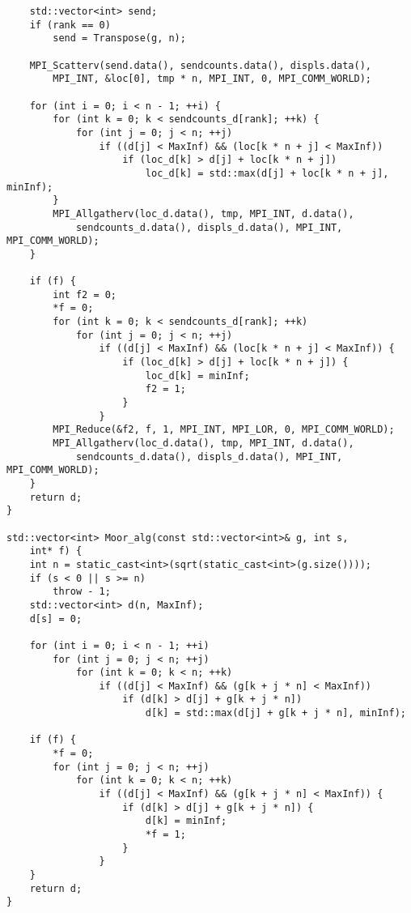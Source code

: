 \documentclass{report}
\begin{document}
\begin{lstlisting}
    std::vector<int> send;
    if (rank == 0)
        send = Transpose(g, n);

    MPI_Scatterv(send.data(), sendcounts.data(), displs.data(),
        MPI_INT, &loc[0], tmp * n, MPI_INT, 0, MPI_COMM_WORLD);

    for (int i = 0; i < n - 1; ++i) {
        for (int k = 0; k < sendcounts_d[rank]; ++k) {
            for (int j = 0; j < n; ++j)
                if ((d[j] < MaxInf) && (loc[k * n + j] < MaxInf))
                    if (loc_d[k] > d[j] + loc[k * n + j])
                        loc_d[k] = std::max(d[j] + loc[k * n + j], minInf);
        }
        MPI_Allgatherv(loc_d.data(), tmp, MPI_INT, d.data(),
            sendcounts_d.data(), displs_d.data(), MPI_INT, MPI_COMM_WORLD);
    }

    if (f) {
        int f2 = 0;
        *f = 0;
        for (int k = 0; k < sendcounts_d[rank]; ++k)
            for (int j = 0; j < n; ++j)
                if ((d[j] < MaxInf) && (loc[k * n + j] < MaxInf)) {
                    if (loc_d[k] > d[j] + loc[k * n + j]) {
                        loc_d[k] = minInf;
                        f2 = 1;
                    }
                }
        MPI_Reduce(&f2, f, 1, MPI_INT, MPI_LOR, 0, MPI_COMM_WORLD);
        MPI_Allgatherv(loc_d.data(), tmp, MPI_INT, d.data(),
            sendcounts_d.data(), displs_d.data(), MPI_INT, MPI_COMM_WORLD);
    }
    return d;
}

std::vector<int> Moor_alg(const std::vector<int>& g, int s,
    int* f) {
    int n = static_cast<int>(sqrt(static_cast<int>(g.size())));
    if (s < 0 || s >= n)
        throw - 1;
    std::vector<int> d(n, MaxInf);
    d[s] = 0;

    for (int i = 0; i < n - 1; ++i)
        for (int j = 0; j < n; ++j)
            for (int k = 0; k < n; ++k)
                if ((d[j] < MaxInf) && (g[k + j * n] < MaxInf))
                    if (d[k] > d[j] + g[k + j * n])
                        d[k] = std::max(d[j] + g[k + j * n], minInf);

    if (f) {
        *f = 0;
        for (int j = 0; j < n; ++j)
            for (int k = 0; k < n; ++k)
                if ((d[j] < MaxInf) && (g[k + j * n] < MaxInf)) {
                    if (d[k] > d[j] + g[k + j * n]) {
                        d[k] = minInf;
                        *f = 1;
                    }
                }
    }
    return d;
}

\end{lstlisting}
\newpage
\end{document}
